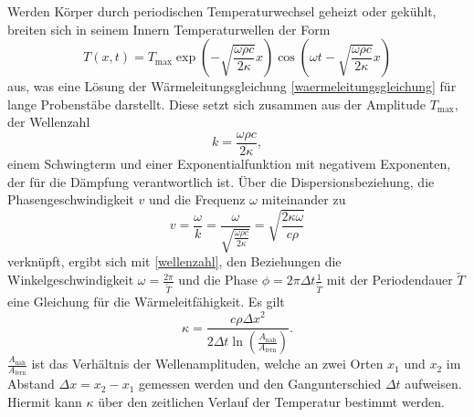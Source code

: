 Werden Körper durch periodischen Temperaturwechsel geheizt oder gekühlt, breiten sich in seinem Innern Temperaturwellen der Form
\begin{equation}
	\label{temperaturwelle}
	T(x,t)= T_\mathup{max} \exp{\left(-\sqrt{\frac{\omega \rho c}{2\kappa}}x\right)} \cos{\left(\omega t - \sqrt{\frac{\omega \rho c}{2\kappa}}x\right)}
\end{equation}
aus, was eine Lösung der Wärmeleitungsgleichung \eqref{waermeleitungsgleichung} für lange Probenstäbe darstellt. 
Diese setzt sich zusammen aus der Amplitude $T_\text{max}$, der Wellenzahl
\begin{equation}
	\label{wellenzahl}
	k=\frac{\omega \rho c}{2\kappa},
\end{equation}
einem Schwingterm und einer Exponentialfunktion mit negativem Exponenten, der für die Dämpfung verantwortlich ist.
Über die Dispersionsbeziehung, die Phasengeschwindigkeit $v$ und die Frequenz $\omega$ miteinander zu
\begin{equation}
	\label{dispersion}
	v=\frac{\omega}{k}=\frac{\omega}{\sqrt{\frac{\omega\rho c}{2\kappa}}}=\sqrt{\frac{2\kappa\omega}{c\rho}}
\end{equation}
verknüpft, ergibt sich mit \eqref{wellenzahl}, den Beziehungen die Winkelgeschwindigkeit $\omega=\frac{2\pi}{\tilde{T}}$ und die Phase $\phi=2\pi\Delta{t}\frac{1}{\tilde{T}}$ mit der Periodendauer $\tilde{T}$ eine Gleichung für die Wärmeleitfähigkeit.
Es gilt
\begin{equation}
	\label{waermeleitfaehigkeit}
	\kappa=\frac{c\rho{\Delta{x}}^2}{2\Delta{t}\ln\left({\frac{A_\text{nah}}{A_\text{fern}}}\right)}.
\end{equation}
$\frac{A_\text{nah}}{A_\text{fern}}$ ist das Verhältnis der Wellenamplituden, welche an zwei Orten $x_1$ und $x_2$ im Abstand
$\Delta{x}=x_2-x_1$ gemessen werden und den Gangunterschied $\Delta{t}$ aufweisen. 
Hiermit kann $\kappa$ über den zeitlichen Verlauf der Temperatur bestimmt werden.
